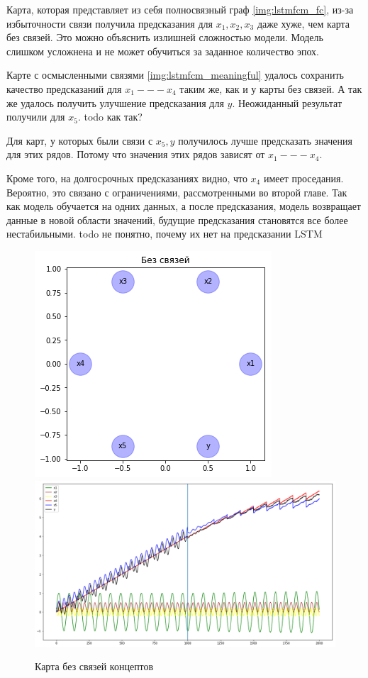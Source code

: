Карта, которая представляет из себя полносвязный граф \ref{img:lstmfcm_fc},
из-за избыточности связи получила предсказания для $ x_1, x_2, x_3 $ даже
хуже, чем карта без связей. Это можно объяснить излишней сложностью модели.
Модель слишком усложнена и не может обучиться за заданное количество эпох.

Карте с осмысленными связями \ref{img:lstmfcm_meaningful} удалось сохранить качество
предсказаний для $ x_1 --- x_4 $ таким же, как и у карты без связей.
А так же удалось получить улучшение предсказания для $ y $.
Неожиданный результат получили для $ x_5 $. todo как так?

Для карт, у которых были связи с $ x_5, y $ получилось лучше предсказать значения
для этих рядов. Потому что значения этих рядов зависят от $ x_1 --- x_4 $.

Кроме того, на долгосрочных предсказаниях видно, что $ x_4 $ имеет проседания.
Вероятно, это связано с ограничениями, рассмотренными во второй главе.
Так как модель обучается на одних данных, а после предсказания, модель возвращает
данные в новой области значений, будущие предсказания становятся все более нестабильными.
todo не понятно, почему их нет на предсказании LSTM

\def\figurename{Рис}
\begin{figure}[t]
	\centering
	\includegraphics[width=0.7\columnwidth]{./img/lstmfcm_empty.png}
	\includegraphics[width=0.9\columnwidth]{./img/lstmfcm_empty_prediction.png}
	\caption{Карта без связей концептов}
	\label{img:lstmfcm_empty}
\end{figure}

